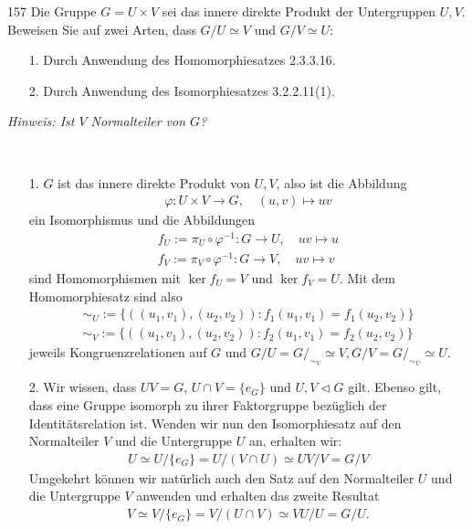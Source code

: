 \begin{algebraUE}{157}
Die Gruppe $G = U \times V$ sei das innere direkte Produkt der Untergruppen $U,V$.
Beweisen Sie auf zwei Arten, dass $G/U \simeq V$ und $G/V \simeq U$:
\begin{itemize}
  \item [1.] Durch Anwendung des Homomorphiesatzes 2.3.3.16.
  \item [2.] Durch Anwendung des Isomorphiesatzes 3.2.2.11(1).
\end{itemize}
\textit{Hinweis: Ist $V$ Normalteiler von $G$?}
\end{algebraUE}
\begin{solution}
\leavevmode \\
\begin{itemize}
  \item [1.] $G$ ist das innere direkte Produkt von $U,V$, also ist die Abbildung
  \begin{align*}
    \varphi: U \times V \rightarrow G, \quad (u,v) \mapsto uv
  \end{align*}
  ein Isomorphismus und die Abbildungen
  \begin{align*}
    f_U := \pi_U \circ \varphi^{-1}: G \rightarrow U, \quad uv \mapsto u \\
    f_V := \pi_V \circ \varphi^{-1}: G \rightarrow V, \quad uv \mapsto v
  \end{align*}
  sind Homomorphismen mit $\ker f_U = V$ und $\ker f_V = U$. Mit dem Homomorphiesatz sind also
  \begin{align*}
    \sim_U := \{((u_1,v_1),(u_2,v_2)): f_1(u_1,v_1) = f_1(u_2,v_2)\} \\
    \sim_V := \{((u_1,v_1),(u_2,v_2)): f_2(u_1,v_1) = f_2(u_2,v_2)\}
  \end{align*}
  jeweils Kongruenzrelationen auf $G$ und $G/U = G/_{\sim_V} \simeq V, G/V = G/_{\sim_U} \simeq U$.
  \item [2.] Wir wissen, dass $UV = G$, $U \cap V = \{e_G\}$ und $ U,V \vartriangleleft G$ gilt.
  Ebenso gilt, dass eine Gruppe isomorph zu ihrer Faktorgruppe bezüglich der Identitätsrelation ist.
  Wenden wir nun den Isomorphiesatz auf den Normalteiler $V$ und die Untergruppe $U$ an, erhalten wir:
  \begin{align*}
    U \simeq U/\{e_G\} = U/(V\cap U) \simeq UV/V = G/V
  \end{align*}
  Umgekehrt können wir natürlich auch den Satz auf den Normalteiler $U$ und die Untergruppe $V$ anwenden
  und erhalten das zweite Resultat
  \begin{align*}
    V \simeq V/\{e_G\} = V/(U\cap V) \simeq VU/U = G/U.
  \end{align*}
\end{itemize}
\end{solution}
